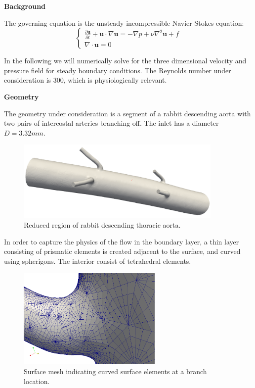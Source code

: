 \textbf{Background}

The governing equation is the unsteady incompressible Navier-Stokes equation:
\begin{equation}
\begin{cases}
\frac{\partial \textbf{u}}{\partial t} + \textbf{u} \cdot \nabla \textbf{u} = - \nabla p + \nu \nabla^2 \textbf{u} + f \\
\nabla \cdot \textbf{u} = 0
\label{IncNS_equations}
\end{cases}
\end{equation}

In the following we will numerically solve for the three dimensional velocity and pressure field for steady boundary conditions. The Reynolds number under consideration is 300, which is physiologically relevant.

\textbf{Geometry}

The geometry under consideration is a segment of a rabbit descending aorta with two pairs of intercostal arteries branching off. The inlet has a diameter $D=3.32mm$.

\begin{figure}
\begin{center}
\includegraphics[width=10cm]{Figures/IntercostalGeometry.png}
\caption{Reduced region of rabbit descending thoracic aorta.}
\end{center}
\end{figure}

In order to capture the physics of the flow in the boundary layer, a thin layer consisting of prismatic elements is created adjacent to the surface, and curved using spherigons. The interior consist of tetrahedral elements. 

\begin{figure}
\begin{center}
\includegraphics[width=7cm]{Figures/spherigons.png}
\caption{Surface mesh indicating curved surface elements at a branch location.}
\end{center}
\end{figure}


